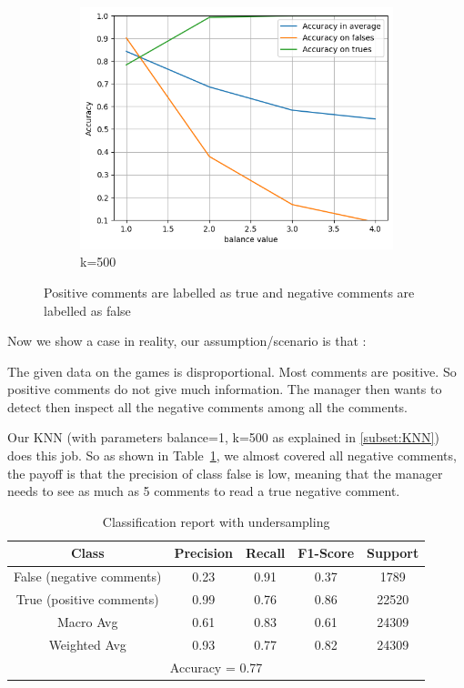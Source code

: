 \documentclass{article}
\begin{document}
\begin{figure}[H]
\begin{subfigure}[t]{0.33\textwidth}
    \includegraphics[width=\linewidth]{balancek500.png}
    \caption{k=500}
  \end{subfigure}
  \caption{Positive comments are labelled as true and negative comments are labelled as false}
  \label{fig:balancenk}
\end{figure}

Now we show a case in reality, our assumption/scenario is that :

The given data on the games is disproportional. Most comments are
positive. So positive comments do not give much information.
The manager then wants to detect then inspect all the negative comments
among all the comments.

Our KNN (with parameters balance=1, k=500 as explained in \ref{subset:KNN}) does this job.
So as shown in Table~\ref{tab:KNN}, we almost covered all negative comments,
the payoff is that the precision of class false is low, meaning
that the manager needs to see as much as 5 comments to read a true negative
comment.

\begin{table}[h]
  \centering
  \begin{tabular}{ccccc}
  \hline
  Class & Precision & Recall & F1-Score & Support \\
  \hline
  False (negative comments) & 0.23 & 0.91 & 0.37 & 1789 \\
  True (positive comments) & 0.99 & 0.76 & 0.86 & 22520 \\
  \hline
  Macro Avg & 0.61 & 0.83 & 0.61 & 24309 \\
  Weighted Avg & 0.93 & 0.77 & 0.82 & 24309 \\
  \hline
  \multicolumn{5}{c}{Accuracy = 0.77} \\
  \hline
  \end{tabular}
  \caption{Classification report with undersampling}
  \label{tab:KNN}
\end{table}
\end{document}
